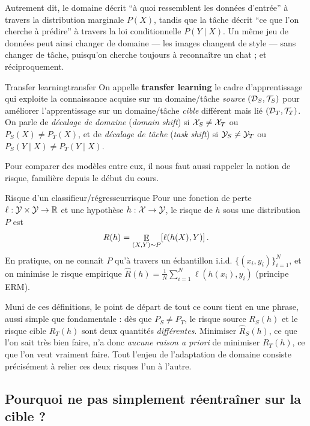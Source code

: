 \documentclass[11pt]{article}
\begin{document}
Autrement dit, le domaine décrit \enquote{à quoi ressemblent les données d'entrée} à travers la
distribution marginale $P(X)$, tandis que la tâche décrit \enquote{ce que l'on cherche à prédire} à
travers la loi conditionnelle $P(Y\mid X)$. Un même jeu de données peut ainsi changer de domaine --- les
images changent de style --- sans changer de tâche, puisqu'on cherche toujours à reconnaître un chat ;
et réciproquement.

\begin{definition}{Transfer learning}{transfer}
On appelle \textbf{transfer learning} le cadre d'apprentissage qui exploite la connaissance acquise sur
un domaine/tâche \emph{source} $(\mathcal{D}_S,\mathcal{T}_S)$ pour améliorer l'apprentissage sur un domaine/tâche
\emph{cible} différent mais lié $(\mathcal{D}_T,\mathcal{T}_T)$. On parle de \emph{décalage de domaine} (\textit{domain
shift}) si $\mathcal{X}_S \neq \mathcal{X}_T$ ou $P_S(X)\neq P_T(X)$, et de \emph{décalage de tâche} (\textit{task shift})
si $\mathcal{Y}_S\neq \mathcal{Y}_T$ ou $P_S(Y\mid X)\neq P_T(Y\mid X)$.
\end{definition}

Pour comparer des modèles entre eux, il nous faut aussi rappeler la notion de risque, familière depuis
le début du cours.

\begin{definition}{Risque d'un classifieur/régresseur}{risque}
Pour une fonction de perte $\ell:\mathcal{Y}\times\mathcal{Y}\to\mathbb{R}$ et une hypothèse $h:\mathcal{X}\to\mathcal{Y}$, le risque de $h$ sous une
distribution $P$ est
\[
R(h) = \mathop{\mathbb{E}}_{(X,Y)\sim P}\!\left[\ell(h(X),Y)\right].
\]
En pratique, on ne connaît $P$ qu'à travers un échantillon i.i.d. $\{(x_i,y_i)\}_{i=1}^N$, et on minimise
le risque empirique $\widehat R(h) = \frac1N\sum_{i=1}^N \ell(h(x_i),y_i)$ (principe ERM).
\end{definition}

Muni de ces définitions, le point de départ de tout ce cours tient en une phrase, aussi simple que
fondamentale : dès que $P_S \neq P_T$, le risque source $R_S(h)$ et le risque cible $R_T(h)$ sont deux
quantités \emph{différentes}. Minimiser $\widehat R_S(h)$, ce que l'on sait très bien faire, n'a donc
\emph{aucune raison a priori} de minimiser $R_T(h)$, ce que l'on veut vraiment faire. Tout l'enjeu de
l'adaptation de domaine consiste précisément à relier ces deux risques l'un à l'autre.

\subsection{Pourquoi ne pas simplement réentraîner sur la cible ?}
\end{document}
